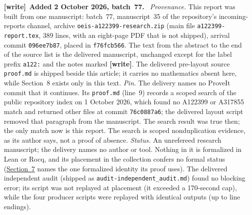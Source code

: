 \documentclass[11pt,letterpaper]{article}
\newenvironment{writenote}[1][]{\par\smallskip\begingroup\small
 \noindent\textbf{[write]}\if\relax\detokenize{#1}\relax\else~\textbf{#1.}\fi\ }%
 {\par\endgroup\smallskip}
\numberwithin{equation}{subsection}
\theoremstyle{definition}
\theoremstyle{remark}
\theoremstyle{plain}
\begin{document}
\begin{writenote}[Added 2 October 2026, batch~77]
\emph{Provenance.} This report was built from one manuscript: batch~77,
manuscript~35 of the repository's incoming-reports channel, archive
\nolinkurl{oeis-a122399-research.zip} (main file
\nolinkurl{a122399-report.tex}, 389 lines, with an eight-page PDF that is not
shipped), arrival commit \texttt{096ee7b87}, placed in \texttt{f76fcb566}.
The text from the abstract to the end of the source list is the delivered
manuscript, unchanged except for the label prefix \texttt{a122:} and the
notes marked \textbf{[write]}. The delivered pre-layout source
\nolinkurl{proof.md} is shipped beside this article; it carries no
mathematics absent here, while Section~8 exists only in this text.
\emph{Pin.} The delivery names no ProveIt commit that it continues. Its
\nolinkurl{proof.md} (line~9) records a scoped search of the public
repository index on 1 October 2026, which found no A122399 or A317855 match
and returned other files at commit \texttt{76c0887a6}; the delivered layout
script removed that paragraph from the manuscript. The search result was
true then; the only match now is this report. The search is scoped
nonduplication evidence, as its author says, not a proof of absence.
\emph{Status.} An unrefereed research manuscript; the delivery names no
author or tool. Nothing in it is formalized in Lean or Rocq, and its
placement in the collection confers no formal status
(\hyperref[a122:elementary-congruence-appendix]{Section~7} names the one
formalized identity its proof uses). The delivered independent audit
(shipped as \nolinkurl{audit-independent_audit.md}) found no blocking
error; its script was not replayed at placement (it exceeded a 170-second
cap), while the four producer scripts were replayed with identical outputs (up to line endings).
\end{writenote}
\end{document}
